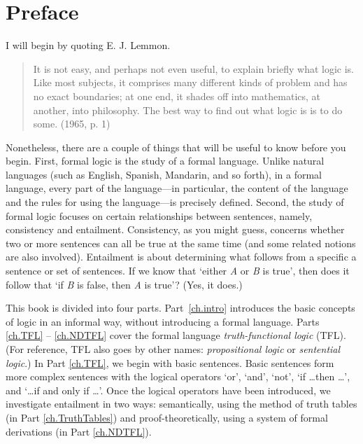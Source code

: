 \chapter{Preface}

I will begin by quoting E. J. Lemmon.
\begin{quote}
It is not easy, and perhaps not even useful, to explain briefly what logic is. Like most subjects, it comprises many different kinds of problem and has no exact boundaries; at one end, it shades off into mathematics, at another, into philosophy. The best way to find out what logic is is to do some. (1965, p. 1)
\end{quote}
Nonetheless, there are a couple of things that will be useful to know before you begin. First, formal logic is the study of a formal language. Unlike natural languages (such as English, Spanish, Mandarin, and so forth), in a formal language, every part of the language—in particular, the content of the language and the rules for using the language—is precisely defined. Second, the study of formal logic focuses on certain relationships between sentences, namely, consistency and entailment. Consistency, as you might guess, concerns whether two or more sentences can all be  true at the same time (and some related notions  are also involved). Entailment is about determining what follows from a specific a sentence or set of sentences. If we know that `either \textit{A} or \textit{B} is true', then does it follow that `if \textit{B} is false, then \textit{A} is true'? (Yes, it  does.)  

This book is divided into four parts. Part~\ref{ch.intro} introduces the basic concepts of logic in an informal way, without introducing a formal language. Parts \ref{ch.TFL} -- \ref{ch.NDTFL} cover the formal language \textit{truth-functional logic} (TFL). (For reference, TFL also goes by other names: \textit{propositional logic} or \textit{sentential logic}.) In Part \ref{ch.TFL}, we begin with basic sentences. Basic sentences form more complex sentences with the logical operators ‘or’, ‘and’, ‘not’, ‘if \ldots then \ldots’, and `\ldots if and only if \ldots'. Once the logical operators have been introduced, we investigate entailment in two ways: semantically, using the method of truth tables (in Part \ref{ch.TruthTables}) and proof-theoretically, using a system of formal derivations (in Part \ref{ch.NDTFL}). 



